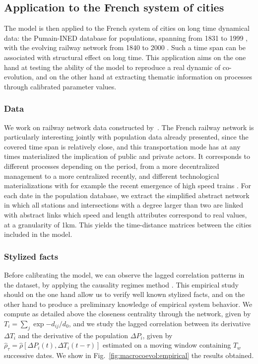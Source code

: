 \documentclass[11pt]{article}
\begin{document}
\subsection{Application to the French system of cities}


The model is then applied to the French system of cities on long time dynamical data: the Pumain-INED database for populations, spanning from 1831 to 1999 \citep{pumain1986fichier}, with the evolving railway network from 1840 to 2000 \citep{thevenin2013mapping}. Such a time span can be associated with structural effect on long time. This application aims on the one hand at testing the ability of the model to reproduce a real dynamic of co-evolution, and on the other hand at extracting thematic information on processes through calibrated parameter values.

\subsubsection{Data}

We work on railway network data constructed by~\cite{thevenin2013mapping}. The French railway network is particularly interesting jointly with population data already presented, since the covered time span is relatively close, and this transportation mode has at any times materialized the implication of public and private actors. It corresponds to different processes depending on the period, from a more decentralized management to a more centralized recently, and different technological materializations with for example the recent emergence of high speed trains \citep{zembri1997fondements}. For each date in the population database, we extract the simplified abstract network in which all stations and intersections with a degree larger than two are linked with abstract links which speed and length attributes correspond to real values, at a granularity of 1km. This yields the time-distance matrices between the cities included in the model.



\subsubsection{Stylized facts}


Before calibrating the model, we can observe the lagged correlation patterns in the dataset, by applying the causality regimes method \citep{raimbault2017identification}. This empirical study should on the one hand allow us to verify well known stylized facts, and on the other hand to produce a preliminary knowledge of empirical system behavior. We compute as detailed above the closeness centrality through the network, given by $T_i = \sum_j \exp{-d_{ij}/d_0}$, and we study the lagged correlation between its derivative $\Delta T_i$ and the derivative of the population $\Delta P_i$, given by $\hat{\rho}_{\tau} = \hat{\rho}\left[\Delta P_i(t),\Delta T_i(t-\tau)\right]$ estimated on a moving window containing $T_w$ successive dates. We show in Fig.~\ref{fig:macrocoevol:empirical} the results obtained.
\end{document}
